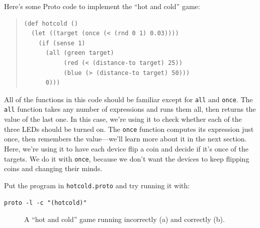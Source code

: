 \documentclass{article}
\newcommand\code[1]{\begin{center}\var{#1}\end{center}}
\newcommand\var[1]{{\tt #1}}
\begin{document}
Here's some Proto code to implement the ``hot and cold'' game:

\begin{quote}
\begin{verbatim}
(def hotcold ()
  (let ((target (once (< (rnd 0 1) 0.03))))
    (if (sense 1)
      (all (green target)
           (red (< (distance-to target) 25))
           (blue (> (distance-to target) 50)))
      0)))
\end{verbatim}
\end{quote}

All of the functions in this code should be familiar except for
\var{all} and \var{once}.  The \var{all} function takes any number of
expressions and runs them all, then returns the value of the last one.
In this case, we're using it to check whether each of the three LEDs
should be turned on.  The \var{once} function computes its expression
just once, then remembers the value---we'll learn more about it in the
next section.  Here, we're using it to have each device flip a coin
and decide if it's once of the targets.  We do it with \var{once},
because we don't want the devices to keep flipping coins and changing
their minds.

Put the program in \var{hotcold.proto} and try running it with:

\code{proto -l -c "(hotcold)"}

\begin{figure}[ht]
\centering
{}
\caption{A ``hot and cold'' game running incorrectly (a) and correctly (b).}
\label{f:ifvmux}
\end{figure}
\end{document}
